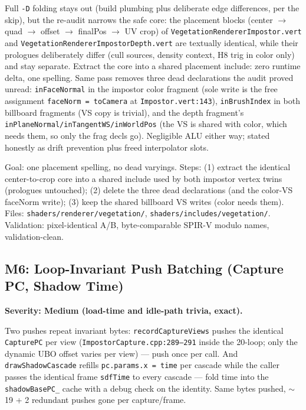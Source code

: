 \documentclass[11pt,a4paper]{article}
\begin{document}
Full \texttt{-D} folding stays out (build plumbing plus deliberate edge
differences, per the skip), but the re-audit narrows the safe core: the
placement blocks (center $\rightarrow$ quad $\rightarrow$ offset
$\rightarrow$ finalPos $\rightarrow$ UV crop) of
\texttt{VegetationRendererImpostor.vert} and
\texttt{VegetationRendererImpostorDepth.vert} are textually identical, while
their prologues deliberately differ (cull sources, density context, H8
trig in color only) and stay separate. Extract the core into a shared
placement include: zero runtime delta, one spelling. Same pass removes
three dead declarations the audit proved unread: \texttt{inFaceNormal} in
the impostor color fragment (sole write is the free assignment
\texttt{faceNorm = toCamera} at \texttt{Impostor.vert:143}),
\texttt{inBrushIndex} in both billboard fragments (VS copy is trivial),
and the depth fragment's \texttt{inPlaneNormal/inTangentWS/inWorldPos}
(the VS is shared with color, which needs them, so only the frag decls
go). Negligible ALU either way; stated honestly as drift prevention plus
freed interpolator slots.

\begin{tcolorbox}[promptbox={Prompt --- M5: placement include, dead decls}]
Goal: one placement spelling, no dead varyings. Steps: (1) extract the
identical center-to-crop core into a shared include used by both impostor
vertex twins (prologues untouched); (2) delete the three dead
declarations (and the color-VS faceNorm write); (3) keep the shared
billboard VS writes (color needs them). Files:
\texttt{shaders/renderer/vegetation/},
\texttt{shaders/includes/vegetation/}. Validation: pixel-identical A/B,
byte-comparable SPIR-V modulo names, validation-clean.
\end{tcolorbox}

\subsection{M6: Loop-Invariant Push Batching (Capture PC, Shadow Time)}

\textbf{Severity: Medium (load-time and idle-path trivia, exact).}

Two pushes repeat invariant bytes: \texttt{recordCaptureViews} pushes the
identical \texttt{CapturePC} per view
(\texttt{ImpostorCapture.cpp:289--291} inside the 20-loop; only the dynamic
UBO offset varies per view) --- push once per call. And
\texttt{drawShadowCascade} refills \texttt{pc.params.x = time} per cascade
while the caller passes the identical frame \texttt{sdfTime} to every
cascade --- fold time into the \texttt{shadowBasePC\_} cache with a debug
check on the identity. Same bytes pushed, $\sim$19 + 2 redundant pushes
gone per capture/frame.
\end{document}
